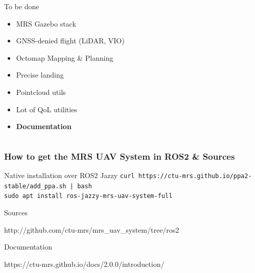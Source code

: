 \documentclass[aspectratio=169,9pt]{beamer}
\begin{document}
\begin{frame}
\begin{columns}[c]
\begin{block}{To be done}
  \begin{itemize}
    \item {\color{red} MRS Gazebo stack}
    \item {\color{red} GNSS-denied flight (LiDAR, VIO)}
    \item {\color{red} Octomap Mapping \& Planning}
    \item {\color{red} Precise landing}
    \item {\color{red} Pointcloud utils}
    \item {\color{red} Lot of QoL utilities}
    \item {\color{red} \textbf{Documentation}}
  \end{itemize}
\end{block}


\end{columns}

\end{frame}



\begin{frame}
  \frametitle{How to get the MRS UAV System in ROS2 \& Sources}

  \begin{block}{Native installation over ROS2 Jazzy}
    \texttt{curl https://ctu-mrs.github.io/ppa2-stable/add\_ppa.sh | bash}\\
    \texttt{sudo apt install ros-jazzy-mrs-uav-system-full}
  \end{block}

  \begin{block}{Sources}
    \begin{center}
      \large {\color{blue} http://github.com/ctu-mrs/mrs\_uav\_system/tree/ros2}
    \end{center}
  \end{block}

  \begin{block}{Documentation}
    \begin{center}
      \large {\color{blue} https://ctu-mrs.github.io/docs/2.0.0/introduction/}
    \end{center}
  \end{block}

\end{frame}



\end{document}
